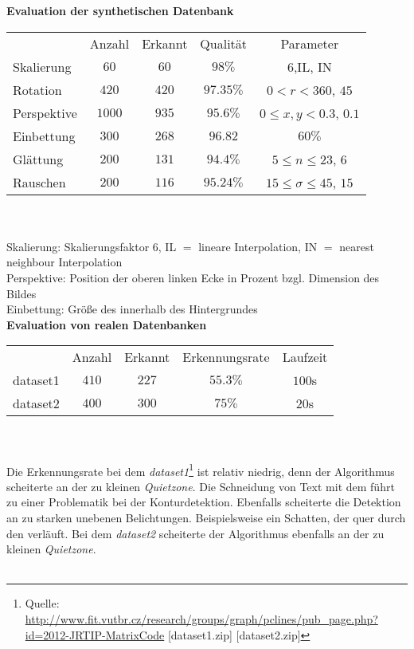 \textbf{Evaluation der synthetischen Datenbank} \\
\begin{tabular}{l c c c c}
 		& Anzahl & Erkannt & Qualität & Parameter \\
		Skalierung & $60$ & $60$ & $98\%$ & $6$,IL, IN \\
		Rotation  & $420$ & $420$ & $97.35\%$ & $0<r<360$, $45$\\
		Perspektive & $1000$ & $935$ & $95.6\%$ & $0 \leq x,y<0.3$, $0.1$\\
		Einbettung & $300$ & $268$ &  $96.82$ & $60\%$\\
		Glättung & $200$ & $131$ & $94.4\%$ &  $5\leq n \leq 23$, $6$\\
		Rauschen & $200$ & $116$ & $95.24\%$ & $15 \leq \sigma \leq 45$, $15$\\
\end{tabular}
\\ \\
Skalierung: Skalierungsfaktor $6$, IL $=$ lineare Interpolation, IN $=$ nearest neighbour Interpolation\\
Perspektive: Position der oberen linken Ecke in Prozent bzgl. Dimension des Bildes \\
Einbettung: Größe des \QRCodes innerhalb des Hintergrundes \\

\textbf{Evaluation von realen Datenbanken} \\


\begin{tabular}{l c c c c}
 		& Anzahl & Erkannt & Erkennungsrate & Laufzeit \\
		dataset1 & $410$ & $227$ & $55.3\%$ & $100$s \\
		dataset2 & $400$ & $300$ & $75\%$ & $20$s \\
\end{tabular}
\\ \\
Die Erkennungsrate bei dem \emph{dataset1}\footnote{Quelle: \url{http://www.fit.vutbr.cz/research/groups/graph/pclines/pub_page.php?id=2012-JRTIP-MatrixCode} [dataset1.zip] [dataset2.zip]} ist relativ niedrig, denn der Algorithmus scheiterte an der zu kleinen  \emph{Quietzone}.
Die Schneidung von Text mit dem \QRCode führt zu einer Problematik bei der Konturdetektion. Ebenfalls scheiterte die Detektion an zu starken unebenen Belichtungen. Beispielsweise ein Schatten, der quer durch den \QRCode verläuft.
Bei dem \emph{dataset2} scheiterte der Algorithmus ebenfalls an der zu kleinen \emph{Quietzone}. \\ \\


